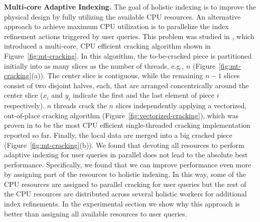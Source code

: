 \textbf{Multi-core Adaptive Indexing.}
The goal of holistic indexing is to improve the physical design by fully utilizing the available CPU resources.
An alternative approach to achieve maximum CPU utilization is to parallelize the index refinement actions triggered by user queries.
This problem was studied in \cite{efficient_cracking}, which introduced a multi-core, CPU efficient cracking algorithm shown in Figure~\ref{fig:mt-cracking}.
In this algorithm, the to-be-cracked piece is partitioned initially into as many slices as the number of threads, e.g., $n$ (Figure~\ref{fig:mt-cracking}(a)).
The center slice is contiguous, while the
remaining $n-1$ slices consist of two disjoint halves, each, that are arranged
concentrically around the center slice ($x_{i}$ and $y_{i}$ indicate the first and the last element of piece $i$ respectively).
$n$ threads crack the $n$ slices independently applying a vectorized, out-of-place cracking algorithm (Figure~\ref{fig:vectorized-cracking}), which was proven  in 
\cite{efficient_cracking} to be the most CPU efficient single-threaded cracking implementation reported so far.
Finally, the local data are merged into a big cracked piece (Figure~\ref{fig:mt-cracking}(b)).
We found that devoting all resources to perform adaptive indexing for user queries in parallel does not lead to the absolute best performance. 
Specifically, we found that we can improve performance even more by assigning part of the resources to holistic indexing. 
In this way, some of the CPU resources are assigned to parallel cracking for user queries but the rest of the CPU resources
are distributed across several holistic workers for additional index refinements.
In the experimental section we show why this approach is better than assigning all available resources to user queries.


